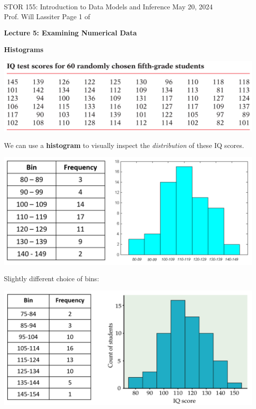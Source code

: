 \documentclass[11pt,letterpaper,twoside]{article}
\newcommand{\whatizit}{Lecture 5: Examining Numerical Data}
\begin{document}
\thispagestyle{empty} \vspace*{-0.75in}

{\bssten STOR 155: Introduction to Data Models and Inference \hfill May 20, 2024 \\
Prof. Will Lassiter  \hfill Page 1 of \pageref{totalpag}}
\vspace{10pt}
\begin{center} {{\Large \bf \whatizit}} \end{center}

{\bf Histograms} \vspace{6pt}

\begin{center}
\includegraphics[scale=0.9]{images/iq.png}
\end{center}

We can use a {\bf histogram} to visually inspect the {\em distribution} of these IQ scores.

\begin{center}
\includegraphics[scale=0.8]{images/hist1.png}
\end{center}

Slightly different choice of bins:

\begin{center}
\includegraphics[scale=0.9]{images/hist2.png}
\end{center}
\end{document}
